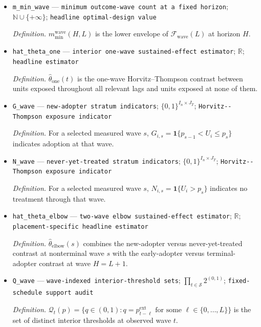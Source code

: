 \documentclass{article}
\begin{document}
\begin{itemize}
  \item \texttt{m\_\allowbreak{}min\_\allowbreak{}wave} --- \texttt{minimum outcome-\allowbreak{}wave count at a fixed horizon}; \(\mathbb N\cup\{+\infty\}\); \texttt{headline optimal-\allowbreak{}design value}
  \par\smallskip\noindent\emph{Definition.} \(m_{\min}^{\mathrm{wave}}(H,L)\) is the lower envelope of \(\mathcal F_{\mathrm{wave}}(L)\) at horizon \(H\).
  \item \texttt{hat\_\allowbreak{}theta\_\allowbreak{}one} --- \texttt{interior one-\allowbreak{}wave sustained-\allowbreak{}effect estimator}; \(\mathbb R\); \texttt{headline estimator}
  \par\smallskip\noindent\emph{Definition.} \(\widehat\theta_{\mathrm{one}}(t)\) is the one-wave Horvitz--Thompson contrast between units exposed throughout all relevant lags and units exposed at none of them.
  \item \texttt{G\_\allowbreak{}wave} --- \texttt{new-\allowbreak{}adopter stratum indicators}; \(\{0,1\}^{I_n\times J_T}\); \texttt{Horvitz-\allowbreak{}-\allowbreak{}Thompson exposure indicator}
  \par\smallskip\noindent\emph{Definition.} For a selected measured wave \(s\), \(G_{i,s}=\mathbf 1\{p_{s-1}<U_i\leq p_s\}\) indicates adoption at that wave.
  \item \texttt{N\_\allowbreak{}wave} --- \texttt{never-\allowbreak{}yet-\allowbreak{}treated stratum indicators}; \(\{0,1\}^{I_n\times J_T}\); \texttt{Horvitz-\allowbreak{}-\allowbreak{}Thompson exposure indicator}
  \par\smallskip\noindent\emph{Definition.} For a selected measured wave \(s\), \(N_{i,s}=\mathbf 1\{U_i>p_s\}\) indicates no treatment through that wave.
  \item \texttt{hat\_\allowbreak{}theta\_\allowbreak{}elbow} --- \texttt{two-\allowbreak{}wave elbow sustained-\allowbreak{}effect estimator}; \(\mathbb R\); \texttt{placement-\allowbreak{}specific headline estimator}
  \par\smallskip\noindent\emph{Definition.} \(\widehat\theta_{\mathrm{elbow}}(s)\) combines the new-adopter versus never-yet-treated contrast at nonterminal wave \(s\) with the early-adopter versus terminal-adopter contrast at wave \(H=L+1\).
  \item \texttt{Q\_\allowbreak{}wave} --- \texttt{wave-\allowbreak{}indexed interior-\allowbreak{}threshold sets}; \(\prod_{t\in\mathcal S}2^{(0,1)}\); \texttt{fixed-\allowbreak{}schedule support audit}
  \par\smallskip\noindent\emph{Definition.} \(\mathcal Q_t(p)=\{q\in(0,1):q=p^{\mathrm{ext}}_{t-\ell}\text{ for some }\ell\in\{0,\ldots,L\}\}\) is the set of distinct interior thresholds at observed wave \(t\).

\end{itemize}
\end{document}
